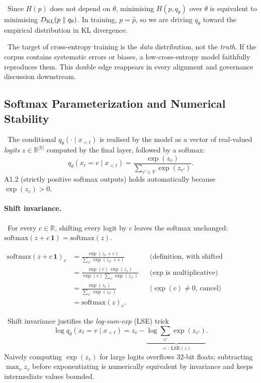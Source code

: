 \Cons\ Since $H(p)$ does not depend on $\theta$, minimising
$H(p, q_\theta)$ over $\theta$ is equivalent to minimising
$D_{\mathrm{KL}}(p \parallel q_\theta)$. In training, $p = \hat p$, so we are
driving $q_\theta$ toward the empirical distribution in KL divergence.

\Emp\ The target of cross-entropy training is the \emph{data}
distribution, not the \emph{truth}. If the corpus contains systematic
errors or biases, a low-cross-entropy model faithfully reproduces them.
This double edge reappears in every alignment and governance
discussion downstream.

\subsection{Softmax Parameterization and Numerical Stability}

\Def\ The conditional $q_\theta(\cdot \mid x_{<t})$ is realised by the
model as a vector of real-valued \emph{logits}
$z \in \mathbb{R}^{|V|}$ computed by the final layer, followed by a
softmax:
\begin{equation}
q_\theta(x_t = v \mid x_{<t})
  = \frac{\exp(z_v)}{\sum_{v' \in V} \exp(z_{v'})}.
\label{eq:softmax}
\end{equation}
A1.2 (strictly positive softmax outputs) holds automatically because
$\exp(z_v) > 0$.

\paragraph{Shift invariance.}
\Ident\ For every $c \in \mathbb{R}$, shifting every logit by $c$
leaves the softmax unchanged:
$\mathrm{softmax}(z + c\,\mathbf{1}) = \mathrm{softmax}(z)$.

\begin{derivation}
\begin{align}
\mathrm{softmax}(z + c\,\mathbf{1})_v
  &= \frac{\exp(z_v + c)}{\sum_{v'} \exp(z_{v'} + c)}
  && \text{(definition, with shifted argument)} \\
  &= \frac{\exp(c)\,\exp(z_v)}{\exp(c)\,\sum_{v'} \exp(z_{v'})}
  && \text{($\exp$ is multiplicative)} \\
  &= \frac{\exp(z_v)}{\sum_{v'} \exp(z_{v'})}
  && \text{($\exp(c) \neq 0$, cancel)} \\
  &= \mathrm{softmax}(z)_v.
\end{align}
\end{derivation}

\Cons\ Shift invariance justifies the \emph{log-sum-exp} (LSE) trick
\begin{equation}
\log q_\theta(x_t = v \mid x_{<t}) = z_v - \underbrace{\log \sum_{v'} \exp(z_{v'})}_{=:\,\mathrm{LSE}(z)}.
\end{equation}
Naively computing $\exp(z_v)$ for large logits overflows 32-bit floats;
subtracting $\max_v z_v$ before exponentiating is numerically equivalent
by invariance and keeps intermediate values bounded.


